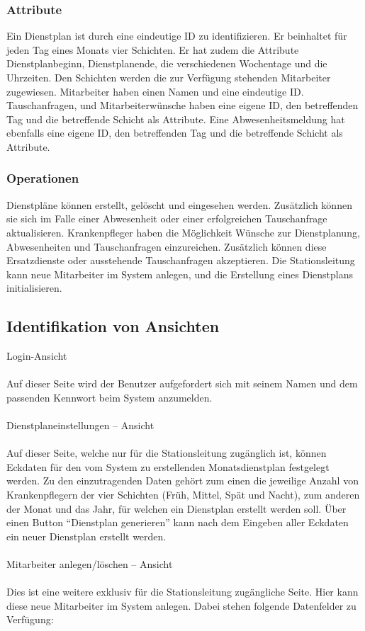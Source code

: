 \documentclass[11pt,
paper=a4,
bibtotocnumbered,	  %
liststotocnumbered,  %
DIV=calc,		  %
tablecaptionabove,	  %
headinclude,
]{article}
\begin{document}
\subsubsection{Attribute}
Ein Dienstplan ist durch eine eindeutige ID zu identifizieren. Er beinhaltet für jeden Tag eines Monats vier Schichten. Er hat zudem die Attribute Dienstplanbeginn, Dienstplanende, die verschiedenen Wochentage und die Uhrzeiten. Den Schichten werden die zur Verfügung stehenden Mitarbeiter zugewiesen. Mitarbeiter haben einen Namen und eine eindeutige ID. Tauschanfragen, und Mitarbeiterwünsche haben eine eigene ID, den betreffenden Tag und die betreffende Schicht als Attribute. Eine Abwesenheitsmeldung hat ebenfalls eine eigene ID, den betreffenden Tag und die betreffende Schicht als Attribute.
\subsubsection{Operationen}
Dienstpläne können erstellt, gelöscht und eingesehen werden. Zusätzlich können sie sich im Falle einer Abwesenheit oder einer erfolgreichen Tauschanfrage aktualisieren. Krankenpfleger haben die Möglichkeit Wünsche zur Dienstplanung, Abwesenheiten und Tauschanfragen einzureichen. Zusätzlich können diese Ersatzdienste oder ausstehende Tauschanfragen akzeptieren. Die Stationsleitung kann neue Mitarbeiter im System anlegen, und die Erstellung eines Dienstplans initialisieren.
\subsection{Identifikation von Ansichten}
Login-Ansicht\\\\
Auf dieser Seite wird der Benutzer aufgefordert sich mit seinem Namen und dem passenden Kennwort beim System anzumelden.\\\\
Dienstplaneinstellungen – Ansicht\\\\
Auf dieser Seite, welche nur für die Stationsleitung zugänglich ist, können Eckdaten für den vom System zu erstellenden Monatsdienstplan festgelegt werden. Zu den einzutragenden Daten gehört zum einen die jeweilige Anzahl von Krankenpflegern der vier Schichten (Früh, Mittel, Spät und Nacht), zum anderen der Monat und das Jahr, für welchen ein Dienstplan erstellt werden soll. Über einen Button “Dienstplan generieren” kann nach dem Eingeben aller Eckdaten ein neuer Dienstplan erstellt werden.\\\\
Mitarbeiter anlegen/löschen – Ansicht\\\\
Dies ist eine weitere exklusiv für die Stationsleitung zugängliche Seite. Hier kann diese neue Mitarbeiter im System anlegen. Dabei stehen folgende Datenfelder zu Verfügung: \\\\
\end{document}
